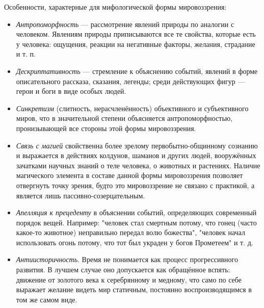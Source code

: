 \documentclass[12pt]{article}
\begin{document}
Особенности, характерные для мифологической формы мировоззрения:
\begin{itemize}
\item \textit{Антропоморфность} --- рассмотрение явлений природы по аналогии с человеком. Явлениям природы
	приписываются все те свойства, которые есть у человека: ощущения, реакции на негативные факторы, желания,
	страдание и т. п.
\item \textit{Дескриптативность} --- стремление к объяснению событий, явлений в форме описательного рассказа, сказания,
	легенды; среди действующих фигур — герои и боги в виде особых людей. 
\item \textit{Синкретизм} (слитность, нерасчленённость) объективного и субъективного миров, что в значительной степени
	объясняется антропоморфностью, пронизывающей все стороны этой формы мировоззрения.
\item \textit{Связь с магией} свойственна более зрелому первобытно-общинному сознанию и выражается в действиях
	колдунов, шаманов и других людей, вооружённых зачатками научных знаний о теле человека, о животных и
	растениях. Наличие магического элемента в составе данной формы мировоззрения позволяет отвергнуть точку
	зрения, будто это мировоззрение не связано с практикой, а является лишь пассивно-созерцательным.
\item \textit{Апелляция к прецеденту} в объяснении событий, определяющих современный порядок вещей.
	Например:
	"человек стал смертным потому, что гонец (часто какое-то животное) неправильно передал волю божества",
	"человек начал использовать огонь потому, что тот был украден у богов Прометеем" и т. д. 
\item \textit{Антиисторичность}.
	Время не понимается как процесс прогрессивного развития. В лучшем случае оно
	допускается как обращённое вспять: движение от золотого века к серебрянному и медному, что само по себе
	выражает желание видеть мир статичным, постоянно воспроизводящимся в том же самом виде. 
\end{itemize}


\newpage
\end{document}
